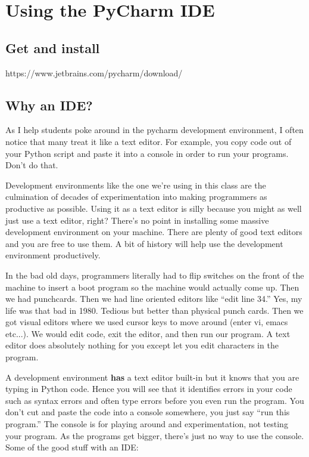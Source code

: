 \documentclass[titlepage]{tufte-book}
\newcounter{problem}
\begin{document}
\chapter{Using the PyCharm IDE}

\setcounter{problem}{1}

\section{Get and install}

\begin{fullwidth}

https://www.jetbrains.com/pycharm/download/

\section{Why an IDE?}

As I help students poke around in the pycharm development environment, I often notice that many treat it like a text editor. For example, you copy code out of your Python script and paste it into a console in order to run your programs.  Don't do that. 

Development environments like the one we're using in this class are the culmination of decades of experimentation into making programmers as productive as possible. Using it as a text editor is silly because you might as well just use a text editor, right? There's no point in installing some massive development environment on your machine. There are plenty of good text editors and you are free to use them. A bit of history will help use the development environment productively.

In the bad old days, programmers literally had to flip switches on the front of the machine to insert a boot  program so the machine would actually come up. Then we had punchcards. Then we had line oriented editors like ``edit line 34.''  Yes, my life was that bad in 1980. Tedious but better than physical punch cards. Then we got visual editors where we used cursor keys to move around (enter vi, emacs etc...). We would edit code, exit the editor, and then run our program. A text editor does absolutely nothing for you except let you edit characters in the program.

A development environment {\bf has} a text editor built-in but it knows that you are typing in Python code. Hence you will see that it identifies errors in your code such as syntax errors and often type errors before you even run the program. You don't cut and paste the code into a console somewhere, you just say ``run this program.'' The console is for playing around and experimentation, not testing your program. As the programs get bigger, there's just no way to use the console.  Some of the good stuff with an IDE:


\end{fullwidth}
\end{document}
